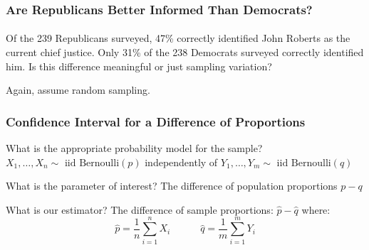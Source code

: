 \begin{frame}
\frametitle{Are Republicans Better Informed Than Democrats?}
\framesubtitle{}
Of the 239 Republicans surveyed, 47\% correctly identified John Roberts as the current chief justice. Only 31\% of the 238 Democrats surveyed correctly identified him. Is this difference meaningful or just sampling variation?

\vspace{2em}
\alert{Again, assume random sampling.}



\end{frame}
\begin{frame}
\frametitle{Confidence Interval for a Difference of Proportions}
	\begin{block}{What is the appropriate probability model for the sample?} 
$X_1, \hdots, X_n \sim \mbox{ iid Bernoulli}(p)$ independently  of $Y_1, \hdots, Y_m \sim \mbox{ iid Bernoulli}(q)$
\end{block}
	\begin{block}{What is the parameter of interest?}
The difference of population proportions $p - q$
\end{block}

\begin{block}{What is our estimator?}
The difference of sample proportions: $\widehat{p} - \widehat{q}$ where:
	$$\widehat{p} = \frac{1}{n}\sum_{i=1}^n X_i \quad \quad \quad	\widehat{q} = \frac{1}{m}\sum_{i=1}^m Y_i$$
\end{block}
\end{frame}



